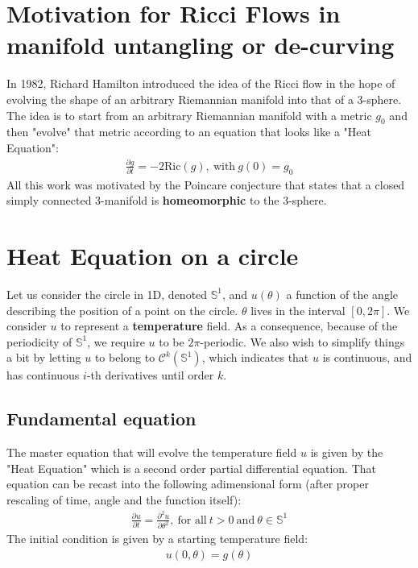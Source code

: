 \documentclass[10pt]{article}
\begin{document}
\section{Motivation for Ricci Flows in manifold untangling or de-curving}

In 1982, Richard Hamilton introduced the idea of the Ricci flow in the hope of evolving the shape of an arbitrary Riemannian manifold into that of a 3-sphere. The idea is to start from an arbitrary Riemannian manifold with a metric $g_{0}$ and then "evolve" that metric according to an equation that looks like a "Heat Equation":
\begin{eqnarray}
\frac{\partial g}{\partial t} = -2\text{Ric}(g),~\text{with}~g(0)=g_{0}
\end{eqnarray}
All this work was motivated by the Poincare conjecture that states that a closed simply connected 3-manifold is \textbf{homeomorphic} to the 3-sphere.

\section{Heat Equation on a circle}

Let us consider the circle in 1D, denoted $\mathbb{S}^{1}$, and $u(\theta)$ a function of the angle describing the position of a point on the circle. $\theta$ lives in the interval $\left[0,2\pi\right]$. We consider $u$ to represent a \textbf{temperature} field. As a consequence, because of the periodicity of $\mathbb{S}^{1}$, we require $u$ to be $2\pi$-periodic. We also wish to simplify things a bit by letting $u$ to belong to $\mathcal{C}^{k}(\mathbb{S}^{1})$, which indicates that $u$ is continuous, and has continuous $i$-th derivatives until order $k$.

\subsection{Fundamental equation}

The master equation that will evolve the temperature field $u$ is given by the "Heat Equation" which is a second order partial differential equation. That equation can be recast into the following adimensional form (after proper rescaling of time, angle and the function itself):
\begin{eqnarray}
\frac{\partial u}{\partial t} = \frac{\partial ^2 u}{\partial \theta ^2},~\text{for all}~t>0~\text{and}~\theta\in\mathbb{S}^1
\end{eqnarray}
The initial condition is given by a starting temperature field:
\begin{eqnarray}
u(0,\theta) = g(\theta)
\end{eqnarray}
\end{document}
